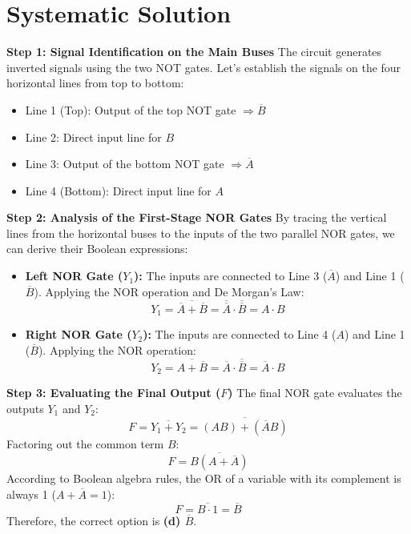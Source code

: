 \documentclass[12pt, a4paper]{report}
\begin{document}
\section{Systematic Solution}
\textbf{Step 1: Signal Identification on the Main Buses}
The circuit generates inverted signals using the two NOT gates. Let's establish the signals on the four horizontal lines from top to bottom:
\begin{itemize}
    \item Line 1 (Top): Output of the top NOT gate $\Rightarrow \overline{B}$
    \item Line 2: Direct input line for $B$
    \item Line 3: Output of the bottom NOT gate $\Rightarrow \overline{A}$
    \item Line 4 (Bottom): Direct input line for $A$
\end{itemize}

\textbf{Step 2: Analysis of the First-Stage NOR Gates}
By tracing the vertical lines from the horizontal buses to the inputs of the two parallel NOR gates, we can derive their Boolean expressions:
\begin{itemize}
    \item \textbf{Left NOR Gate ($Y_1$):} The inputs are connected to Line 3 ($\overline{A}$) and Line 1 ($\overline{B}$). Applying the NOR operation and De Morgan's Law: 
    \begin{equation}
        Y_1 = \overline{\overline{A} + \overline{B}} = \overline{\overline{A}} \cdot \overline{\overline{B}} = A \cdot B
    \end{equation}
    \item \textbf{Right NOR Gate ($Y_2$):} The inputs are connected to Line 4 ($A$) and Line 1 ($\overline{B}$). Applying the NOR operation:
    \begin{equation}
        Y_2 = \overline{A + \overline{B}} = \overline{A} \cdot \overline{\overline{B}} = \overline{A} \cdot B
    \end{equation}
\end{itemize}

\textbf{Step 3: Evaluating the Final Output ($F$)}
The final NOR gate evaluates the outputs $Y_1$ and $Y_2$:
\begin{equation}
    F = \overline{Y_1 + Y_2} = \overline{(AB) + (\overline{A}B)}
\end{equation}
Factoring out the common term $B$:
\begin{equation}
    F = \overline{B(A + \overline{A})}
\end{equation}
According to Boolean algebra rules, the OR of a variable with its complement is always 1 ($A + \overline{A} = 1$):
\begin{equation}
    F = \overline{B \cdot 1} = \overline{B}
\end{equation}
Therefore, the correct option is \textbf{(d) $\overline{B}$}.
\end{document}
